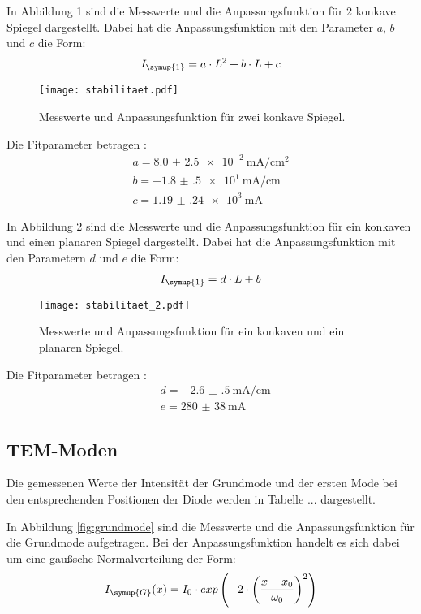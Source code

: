 In Abbildung 1 sind die Messwerte und die Anpassungsfunktion für 2 konkave Spiegel dargestellt.
Dabei hat die Anpassungsfunktion mit den Parameter $a$, $b$ und $c$ die Form:
\begin{align*}
  I_{\symup{1}} = a \cdot L^2 + b \cdot L + c
\end{align*}
\begin{figure}[H]
  \centering
  \texttt{[image: stabilitaet.pdf]}
  \caption{Messwerte und Anpassungsfunktion für zwei konkave Spiegel.}
  \label{fig:plot}
\end{figure}

Die Fitparameter betragen :
\begin{align*}
  a = \SI{ 8.0(25)e-2}{\milli\ampere\per\centi\meter\squared} \\
  b = \SI{-1.8(5)e1}{\milli\ampere\per\centi\meter} \\
  c = \SI{1.19(24)e3}{\milli\ampere}
\end{align*}


In Abbildung 2 sind die Messwerte und die Anpassungsfunktion für ein konkaven und einen
planaren Spiegel dargestellt.
Dabei hat die Anpassungsfunktion mit den Parametern $d$ und $e$ die Form:
\begin{align*}
  I_{\symup{1}} = d \cdot L + b
\end{align*}

\begin{figure}[H]
  \centering
  \texttt{[image: stabilitaet\_2.pdf]}
  \caption{Messwerte und Anpassungsfunktion für ein konkaven und ein planaren Spiegel.}
  \label{fig:plot}
\end{figure}

Die Fitparameter betragen :
\begin{align*}
  &d = \SI{-2.6(5)}{\milli\ampere\per\centi\meter} \\
  &e = \SI{280(38)}{\milli\ampere}
\end{align*}

\subsection{TEM-Moden}
Die gemessenen Werte der Intensität der Grundmode und der ersten Mode bei den
entsprechenden Positionen der Diode werden in Tabelle ... dargestellt.

In Abbildung \ref{fig:grundmode} sind die Messwerte und die Anpassungsfunktion
für die Grundmode aufgetragen. Bei der Anpassungsfunktion handelt es sich dabei
um eine gaußsche Normalverteilung der Form:
\begin{equation*}
  I_\symup{G}(x) = I_0 \cdot exp\left(-2 \cdot \left(\frac{x - x_0}{\omega_0}\right)^2\right)
\end{equation*}

